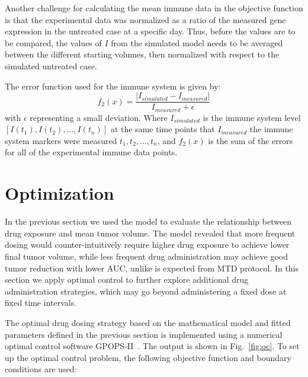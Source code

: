 Another challenge for calculating the mean immune data in the objective function is that the experimental data was normalized as a ratio of the measured gene expression in the untreated case at a specific day. Thus, before the values are to be compared, the values of $I$ from the simulated model needs to be averaged between the different starting volumes, then normalized with respect to the simulated untreated case.

The error function used for the immune system is given by:
\begin{equation}
	f_2(x) = \frac{|I_{simulated}-I_{measured}|}{I_{measured}+\epsilon}
\end{equation}
with $\epsilon$ representing a small deviation. Where $I_{simulated}$ is the immune system level $[I(t_1), I(t_2), \dots, I(t_n)]$ at the same time points that $I_{measured}$ the immune system markers were measured $t_1, t_2, \dots, t_n$, and  $f_2(x)$ is the sum of the errors for all of the experimental immune data points.

\section{Optimization}

In the previous section we used the model to evaluate the relationship between drug exposure and mean tumor volume. The model revealed that more frequent dosing would counter-intuitively require higher drug exposure to achieve lower final tumor volume, while less frequent drug administration may achieve good tumor reduction with lower \ac{AUC}, unlike is expected from \ac{MTD} protocol. In this section we apply optimal control to further explore additional drug administration strategies, which may go beyond administering a fixed dose at fixed time intervals. 

The optimal drug dosing strategy based on the mathematical model and fitted parameters defined in the previous section is implemented using a numerical optimal control software GPOPS-II~\cite{patterson2014gpops}. The output is shown in  Fig.~\ref{fig:oc}. To set up the optimal control problem, the following objective function and boundary conditions are used: 

